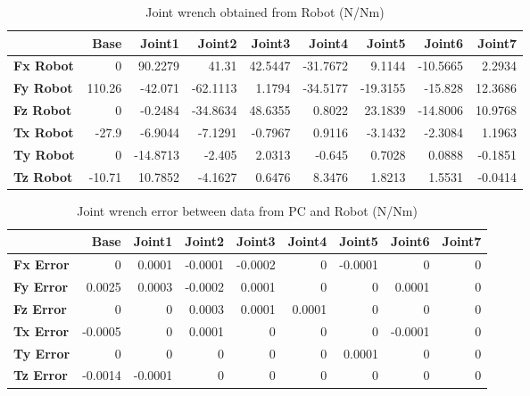 \begin{table}[h!]
	\centering
	\caption{Joint wrench obtained from Robot (N/Nm)}
	\label{wrech_Robot_Pose1}
	\begin{tabular}{|l|r|r|r|r|r|r|r|r|}
		\hline
		\textbf{} & \textbf{Base} & \textbf{Joint1}  & \textbf{Joint2}  & \textbf{Joint3}  & \textbf{Joint4}  & \textbf{Joint5}  & \textbf{Joint6}  & \textbf{Joint7} \\ \hline
		\textbf{Fx Robot}  & 0        & 90.2279        & 41.31        & 42.5447        & -31.7672        & 9.1144        & -10.5665        & 2.2934 \\ \hline
		\textbf{Fy Robot}  & 110.26        & -42.071        & -62.1113        & 1.1794        & -34.5177        & -19.3155        & -15.828        & 12.3686 \\ \hline
		\textbf{Fz Robot}  & 0        & -0.2484        & -34.8634        & 48.6355        & 0.8022        & 23.1839        & -14.8006        & 10.9768 \\ \hline
		\textbf{Tx Robot}  & -27.9        & -6.9044        & -7.1291        & -0.7967        & 0.9116        & -3.1432        & -2.3084        & 1.1963 \\ \hline
		\textbf{Ty Robot}  & 0        & -14.8713        & -2.405        & 2.0313        & -0.645        & 0.7028        & 0.0888        & -0.1851 \\ \hline
		\textbf{Tz Robot}  & -10.71        & 10.7852        & -4.1627        & 0.6476        & 8.3476        & 1.8213        & 1.5531        & -0.0414 \\ \hline
	\end{tabular}
\end{table}

\begin{table}[h!]
	\centering
	\caption{Joint wrench error between data from PC and Robot (N/Nm)}
	\label{wrech_Error_Pose1}
	\begin{tabular}{|l|r|r|r|r|r|r|r|r|}
		\hline
		\textbf{}  & \textbf{Base} & \textbf{Joint1}  & \textbf{Joint2}  & \textbf{Joint3}  & \textbf{Joint4}  & \textbf{Joint5}  & \textbf{Joint6}  & \textbf{Joint7} \\ \hline
		\textbf{Fx Error}  & 0        & 0.0001        & -0.0001        & -0.0002        & 0        & -0.0001        & 0        & 0 \\ \hline
		\textbf{Fy Error}  & 0.0025        & 0.0003        & -0.0002        & 0.0001        & 0        & 0        & 0.0001        & 0 \\ \hline
		\textbf{Fz Error}  & 0        & 0        & 0.0003        & 0.0001        & 0.0001        & 0        & 0        & 0 \\ \hline
		\textbf{Tx Error}  & -0.0005        & 0        & 0.0001        & 0        & 0        & 0        & -0.0001        & 0 \\ \hline
		\textbf{Ty Error}  & 0        & 0        & 0        & 0        & 0        & 0.0001        & 0        & 0 \\ \hline
		\textbf{Tz Error}  & -0.0014        & -0.0001        & 0        & 0        & 0        & 0        & 0        & 0 \\ \hline
	\end{tabular}
\end{table}

